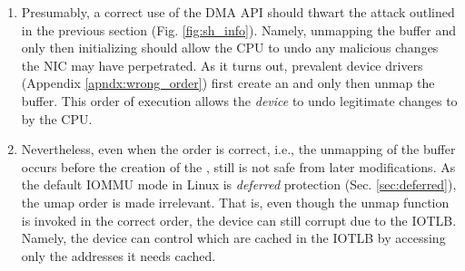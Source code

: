 \begin{enumerate}[label=(\alph*)]

\item Presumably, a correct use of the DMA API should thwart the attack outlined in the previous section (Fig. \ref{fig:sh_info}). Namely, unmapping the buffer and only then initializing \shinfo{} should allow the CPU to undo any malicious changes the NIC may have perpetrated. 
As it turns out, prevalent device drivers (Appendix \ref{apndx:wrong_order}) first create an \skb{} and only then unmap the buffer. This order of execution allows the \emph{device} to undo legitimate changes to \shinfo{} by the CPU. 

\item Nevertheless, even when the order is correct, i.e., the unmapping of the buffer occurs before the creation of the \skb{}, still \shinfo{} is not safe from later modifications. As the default IOMMU mode in Linux is \emph{deferred} protection (Sec. \ref{sec:deferred}), the umap order is made irrelevant. That is, even though the unmap function is invoked in the correct order, the device can still corrupt \shinfo{} due to the IOTLB. Namely, the device can control which \iova{} are cached in the IOTLB by accessing only the addresses it needs cached. 


\end{enumerate}
